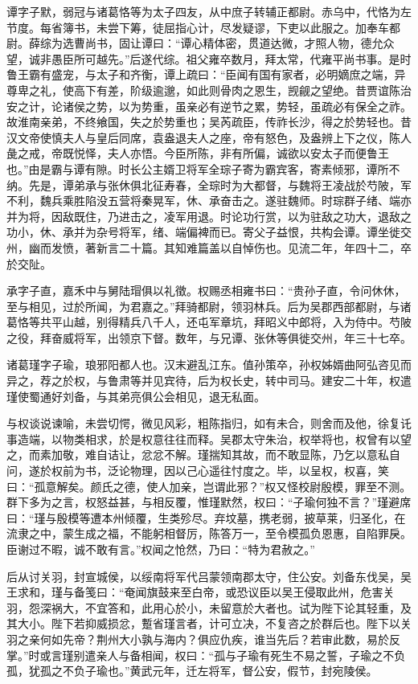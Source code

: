 \documentclass[12pt,UTF8]{ctexbook}
\begin{document}
谭字子默，弱冠与诸葛恪等为太子四友，从中庶子转辅正都尉。赤乌中，代恪为左节度。每省簿书，未尝下筹，徒屈指心计，尽发疑谬，下吏以此服之。加奉车都尉。薛综为选曹尚书，固让谭曰：“谭心精体密，贯道达微，才照人物，德允众望，诚非愚臣所可越先。”后遂代综。祖父雍卒数月，拜太常，代雍平尚书事。是时鲁王霸有盛宠，与太子和齐衡，谭上疏曰：“臣闻有国有家者，必明嫡庶之端，异尊卑之礼，使高下有差，阶级逾邈，如此则骨肉之恩生，觊觎之望绝。昔贾谊陈治安之计，论诸侯之势，以为势重，虽亲必有逆节之累，势轻，虽疏必有保全之祚。故淮南亲弟，不终飨国，失之於势重也；吴芮疏臣，传祚长沙，得之於势轻也。昔汉文帝使慎夫人与皇后同席，袁盎退夫人之座，帝有怒色，及盎辨上下之仪，陈人彘之戒，帝既悦怿，夫人亦悟。今臣所陈，非有所偏，诚欲以安太子而便鲁王也。”由是霸与谭有隙。时长公主婿卫将军全琮子寄为霸宾客，寄素倾邪，谭所不纳。先是，谭弟承与张休俱北征寿春，全琮时为大都督，与魏将王凌战於芍陂，军不利，魏兵乘胜陷没五营将秦晃军，休、承奋击之。遂驻魏师。时琮群子绪、端亦并为将，因敌既住，乃进击之，凌军用退。时论功行赏，以为驻敌之功大，退敌之功小，休、承并为杂号将军，绪、端偏裨而已。寄父子益恨，共构会谭。谭坐徙交州，幽而发愤，著新言二十篇。其知难篇盖以自悼伤也。见流二年，年四十二，卒於交阯。

承字子直，嘉禾中与舅陆瑁俱以礼徵。权赐丞相雍书曰：“贵孙子直，令问休休，至与相见，过於所闻，为君嘉之。”拜骑都尉，领羽林兵。后为吴郡西部都尉，与诸葛恪等共平山越，别得精兵八千人，还屯军章坑，拜昭义中郎将，入为侍中。芍陂之役，拜奋威将军，出领京下督。数年，与兄谭、张休等俱徙交州，年三十七卒。

诸葛瑾字子瑜，琅邪阳都人也。汉末避乱江东。值孙策卒，孙权姊婿曲阿弘咨见而异之，荐之於权，与鲁肃等并见宾待，后为权长史，转中司马。建安二十年，权遣瑾使蜀通好刘备，与其弟亮俱公会相见，退无私面。

与权谈说谏喻，未尝切愕，微见风彩，粗陈指归，如有未合，则舍而及他，徐复讬事造端，以物类相求，於是权意往往而释。吴郡太守朱治，权举将也，权曾有以望之，而素加敬，难自诘让，忿忿不解。瑾揣知其故，而不敢显陈，乃乞以意私自问，遂於权前为书，泛论物理，因以己心遥往忖度之。毕，以呈权，权喜，笑曰：“孤意解矣。颜氏之德，使人加亲，岂谓此邪？”权又怪校尉殷模，罪至不测。群下多为之言，权怒益甚，与相反覆，惟瑾默然，权曰：“子瑜何独不言？”瑾避席曰：“瑾与殷模等遭本州倾覆，生类殄尽。弃坟墓，携老弱，披草莱，归圣化，在流隶之中，蒙生成之福，不能躬相督厉，陈答万一，至令模孤负恩惠，自陷罪戾。臣谢过不暇，诚不敢有言。”权闻之怆然，乃曰：“特为君赦之。”

后从讨关羽，封宣城侯，以绥南将军代吕蒙领南郡太守，住公安。刘备东伐吴，吴王求和，瑾与备笺曰：“奄闻旗鼓来至白帝，或恐议臣以吴王侵取此州，危害关羽，怨深祸大，不宜答和，此用心於小，未留意於大者也。试为陛下论其轻重，及其大小。陛下若抑威损忿，蹔省瑾言者，计可立决，不复咨之於群后也。陛下以关羽之亲何如先帝？荆州大小孰与海内？俱应仇疾，谁当先后？若审此数，易於反掌。”时或言瑾别遣亲人与备相闻，权曰：“孤与子瑜有死生不易之誓，子瑜之不负孤，犹孤之不负子瑜也。”黄武元年，迁左将军，督公安，假节，封宛陵侯。
\end{document}
